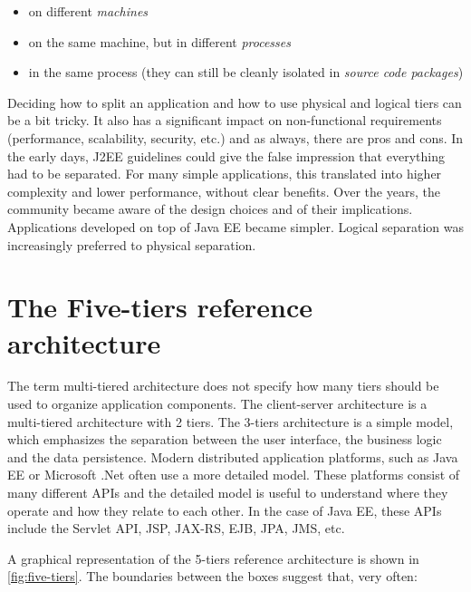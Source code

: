 
\begin{itemize}
\item on different \emph{machines}
\item on the same machine, but in different \emph{processes}
\item in the same process (they can still be cleanly isolated in \emph{source code packages})
\end{itemize}

Deciding how to split an application and how to use physical and logical tiers can be a bit tricky. It also has a significant impact on non-functional requirements (performance, scalability, security, etc.) and as always, there are pros and cons. In the early days, J2EE guidelines could give the false impression that everything had to be separated. For many simple applications, this translated into higher complexity and lower performance, without clear benefits. Over the years, the community became aware of the design choices and of their implications. Applications developed on top of Java EE became simpler. Logical separation was increasingly preferred to physical separation.

\section{The Five-tiers reference architecture}

The term multi-tiered architecture does not specify how many tiers should be used to organize application components. The client-server architecture is a multi-tiered architecture with 2 tiers. The 3-tiers architecture is a simple model, which emphasizes the separation between the user interface, the business logic and the data persistence. Modern distributed application platforms, such as Java EE or Microsoft .Net often use a more detailed model. These platforms consist of many different APIs and the detailed model is useful to understand where they operate and how they relate to each other. In the case of Java EE, these APIs include the Servlet API, \ac{JSP}, \ac{JAX-RS}, \ac{EJB}, \ac{JPA}, \ac{JMS}, etc.

A graphical representation of the 5-tiers reference architecture is shown in \ref{fig:five-tiers}. The boundaries between the boxes suggest that, very often:

